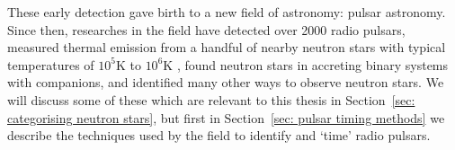 These early detection gave birth to a new field of astronomy: pulsar astronomy.
Since then, researches in the field have detected over 2000 radio pulsars, measured thermal
emission from a handful of nearby neutron stars with typical temperatures of
$10^{5}$K to $10^{6}$K \citep{pavlov2003thermal}, found neutron stars in
accreting binary systems with companions, and identified many other ways to
observe neutron stars. We will discuss some of these which are relevant to this
thesis in Section~\ref{sec: categorising neutron stars}, but first in
Section~\ref{sec: pulsar timing methods} we describe the techniques used by the
field to identify and `time' radio pulsars.
